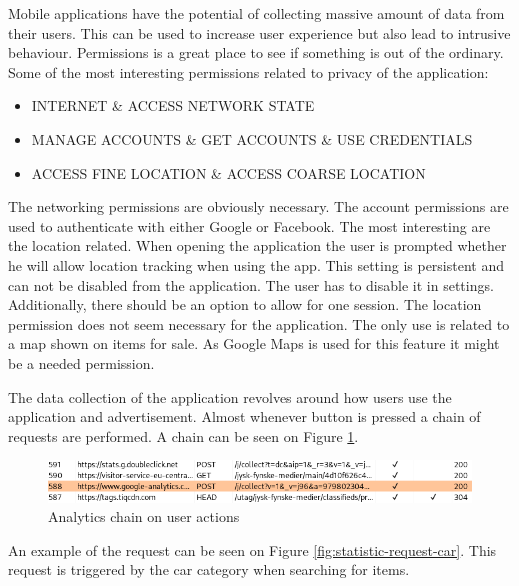 Mobile applications have the potential of collecting massive amount of data from their users. This can be used to increase user experience but also lead to intrusive behaviour. Permissions is a great place to see if something is out of the ordinary. Some of the most interesting permissions related to privacy of the application:  

\begin{itemize}
    \item INTERNET \& ACCESS NETWORK STATE
    \item MANAGE ACCOUNTS \& GET ACCOUNTS \& USE CREDENTIALS
    \item ACCESS FINE LOCATION \& ACCESS COARSE LOCATION
\end{itemize}

The networking permissions are obviously necessary. The account permissions are used to authenticate with either Google or Facebook. The most interesting are the location related. When opening the application the user is prompted whether he will allow location tracking when using the app. This setting is persistent and can not be disabled from the application. The user has to disable it in settings. Additionally, there should be an option to allow for one session. The location permission does not seem necessary for the application. The only use is related to a map shown on items for sale. As Google Maps is used for this feature it might be a needed permission.

The data collection of the application revolves around how users use the application and advertisement. Almost whenever button is pressed a chain of requests are performed. A chain can be seen on Figure \ref{fig:statistics-chain}. 

\begin{figure}[htbp]
    \centering
    \includegraphics[width=1\columnwidth]{../static-analysis/pictures/statistics_trackview_chain.png}
    \caption{Analytics chain on user actions}
    \label{fig:statistics-chain}
\end{figure}

An example of the request can be seen on Figure \ref{fig:statistic-request-car}. This request is triggered by the car category when searching for items.  

